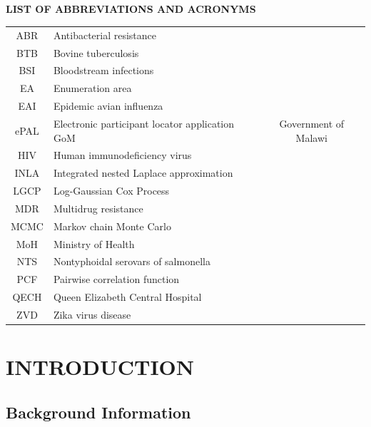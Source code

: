 \documentclass[12pt,a4paper]{report}
\makeatletter
\renewcommand\listoftables{%
	\section*{\listtablename}%
	\@mkboth{\MakeUppercase\listtablename}%
	{\MakeUppercase\listtablename}%
	\@starttoc{lot}%
}
\makeatother
\begin{document}
\listoftables

\newpage





	\begin{center}
		\bf{LIST OF ABBREVIATIONS AND ACRONYMS}
	\end{center}

\renewcommand\contentsname{LIST OF ABBREVIATIONS AND ACRONYMS}

\begin{table}[H]
\begin{tabular}{c l c}
ABR & Antibacterial resistance\\
BTB & Bovine tuberculosis\\
BSI &  Bloodstream infections\\
EA & Enumeration area\\
EAI & Epidemic avian influenza\\
ePAL & Electronic participant locator application
GoM & Government of Malawi\\
HIV & Human immunodeficiency virus\\
INLA & Integrated nested Laplace approximation\\
LGCP &  Log-Gaussian Cox Process\\
MDR & Multidrug resistance\\
MCMC & Markov chain Monte Carlo\\
MoH & Ministry of Health\\
NTS & Nontyphoidal serovars of salmonella\\
PCF & Pairwise correlation function\\
QECH & Queen Elizabeth Central Hospital\\
ZVD & Zika virus disease\\
\end{tabular}
\end{table}


\chapter{INTRODUCTION}


\begin{flushleft}
\section{Background Information}
\end{flushleft}
\end{document}
